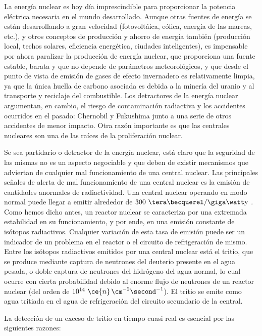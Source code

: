 La energía nuclear es hoy día imprescindible para proporcionar la potencia eléctrica necesaria en el mundo desarrollado.  Aunque  otras fuentes de energía se están desarrollando a gran velocidad (fotovoltáica, eólica, energía de las mareas, etc.), y otros conceptos de producción y ahorro de energía también (producción local, techos solares, eficiencia energética, ciudades inteligentes), es impensable por ahora paralizar la producción de energía nuclear, que proporciona una fuente estable, barata y que no depende de parámetros meteorológicos, y que desde el  punto de vista de emisión de gases de efecto invernadero es relativamente limpia, ya que la única huella de carbono asociada es debida a la minería del uranio y al transporte y reciclaje del combustible.
Los detractores de la energía nuclear argumentan, en cambio, el riesgo de contaminación radiactiva y los accidentes ocurridos en el pasado: Chernobil y Fukushima junto a una serie de otros accidentes de menor impacto. Otra razón importante es que las centrales nucleares son una de las raíces de la proliferación nuclear.

Se sea partidario o detractor de la energía nuclear, está claro que la seguridad de las mismas no es un aspecto  negociable y que deben de existir mecanismos que adviertan de cualquier mal funcionamiento de una central nuclear.  Las principales señales de alerta de mal funcionamiento de una central nuclear es la emisión de cantidades anormales de radiactividad. Una central nuclear operando en modo normal puede llegar a emitir alrededor de $300\ \tera\becquerel/\giga\watt\mathrm{y}$ \cite{300TBq}. Como hemos dicho antes, un reactor nuclear se caracteriza por una extremada estabilidad en su funcionamiento, y por ende, en una emisión constante  de isótopos radiactivos.  Cualquier variación de esta tasa de emisión puede ser un indicador de un problema en el reactor o el circuito de refrigeración de mismo. Entre los isótopos radiactivos emitidos por una central  nuclear está el tritio, que se produce mediante captura de neutrones del deuterio presente en el  agua pesada, o doble captura de neutrones del hidrógeno del agua normal, lo cual ocurre con cierta probabilidad debido al enorme flujo de neutrones de un reactor nuclear (del orden de $10^{14} ~\ce{n} \, \cm^{-2}\second^{-1}$).  El tritio se emite como agua tritiada en el agua de refrigeración del circuito secundario  de la central.  

La detección de un exceso de tritio en tiempo cuasi real es esencial por las siguientes razones:

